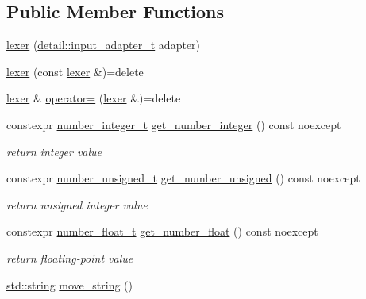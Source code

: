 \subsection*{Public Member Functions}
\begin{DoxyCompactItemize}
\item 
\hyperlink{classnlohmann_1_1detail_1_1lexer_a0d7de7b99bc839ea9a39dd738d05d89c}{lexer} (\hyperlink{namespacenlohmann_1_1detail_ae132f8cd5bb24c5e9b40ad0eafedf1c2}{detail\+::input\+\_\+adapter\+\_\+t} adapter)
\item 
\hyperlink{classnlohmann_1_1detail_1_1lexer_a2e8ce2a0d266d148b69dfbcc2e4ad71a}{lexer} (const \hyperlink{classnlohmann_1_1detail_1_1lexer}{lexer} \&)=delete
\item 
\hyperlink{classnlohmann_1_1detail_1_1lexer}{lexer} \& \hyperlink{classnlohmann_1_1detail_1_1lexer_a33e97dee7c5faf1b36aff5b74a6c8f55}{operator=} (\hyperlink{classnlohmann_1_1detail_1_1lexer}{lexer} \&)=delete
\item 
constexpr \hyperlink{classnlohmann_1_1detail_1_1lexer_a9cd1b11cc67edbfb2613c788b5bd337c}{number\+\_\+integer\+\_\+t} \hyperlink{classnlohmann_1_1detail_1_1lexer_afa338d17c0a7e834c73104258a2c8ced}{get\+\_\+number\+\_\+integer} () const noexcept
\begin{DoxyCompactList}\small\item\em return integer value \end{DoxyCompactList}\item 
constexpr \hyperlink{classnlohmann_1_1detail_1_1lexer_a105d1dfeab414a572655895cdd96a52a}{number\+\_\+unsigned\+\_\+t} \hyperlink{classnlohmann_1_1detail_1_1lexer_a56640fb92293e0c17742ca3c814d74d6}{get\+\_\+number\+\_\+unsigned} () const noexcept
\begin{DoxyCompactList}\small\item\em return unsigned integer value \end{DoxyCompactList}\item 
constexpr \hyperlink{classnlohmann_1_1detail_1_1lexer_aa7f9e7b2bcd311fb86e2da43761a6619}{number\+\_\+float\+\_\+t} \hyperlink{classnlohmann_1_1detail_1_1lexer_ac013af35a21e9387993b19da5b3e0ae2}{get\+\_\+number\+\_\+float} () const noexcept
\begin{DoxyCompactList}\small\item\em return floating-\/point value \end{DoxyCompactList}\item 
\hyperlink{namespacenlohmann_1_1detail_a1ed8fc6239da25abcaf681d30ace4985ab45cffe084dd3d20d928bee85e7b0f21}{std\+::string} \hyperlink{classnlohmann_1_1detail_1_1lexer_a73216fe28e91a0aa3bdae77a89ce554b}{move\+\_\+string} ()

\end{DoxyCompactItemize}
